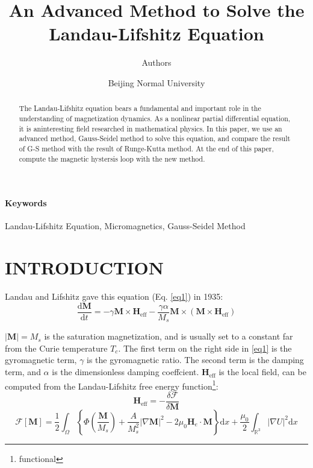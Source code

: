 \documentclass{article}
\renewcommand{\d}[2]{\frac{\text{d} #1}{\text{d} #2}} %
\begin{document}
\title{An Advanced Method to Solve the Landau-Lifshitz Equation}
\author{Authors}
\date{Beijing Normal University}
\maketitle


\begin{abstract}
The Landau-Lifshitz equation bears a fundamental and important role in the understanding of magnetization dynamics. As a nonlinear partial differential equation, it is aninteresting field researched in mathematical physics. In this paper, we use an advanced method, Gauss-Seidel method to solve this equation, and compare the result of G-S method with the result of Runge-Kutta method. At the end of this paper, compute the magnetic hystersis loop with the new method.
\end{abstract}
\paragraph{Keywords} Landau-Lifshitz Equation, Micromagnetics, Gauss-Seidel Method


\section{INTRODUCTION}
Landau and Lifshitz gave this equation (Eq. \eqref{eq1}) in 1935:
\begin{equation}
\d{\bm{M}}{t}=-\gamma \bm{M}\times \bm{H}_\text{eff}-\frac{\gamma \alpha}{M_s} \bm{M}\times \left(\bm{M}\times\bm{H}_\text{eff}\right)\label{eq1}
\end{equation}

$\left|\bm{M}\right|=M_s$ is the saturation magnetization, and is usually set to a constant far from the Curie temperature $T_c$. The first term on the right side in \eqref{eq1} is the gyromagnetic term, $\gamma$ is the gyromagnetic ratio. The second term is the damping term, and $\alpha$ is the dimensionless damping coeffcient. $\bm{H}_\text{eff}$ is the local field, can be computed from the Landau-Lifshitz free energy function\footnote{functional}:
\begin{equation}
\bm{H}_\text{eff}=-\frac{\delta \mathcal{F}}{\delta \bm{M}}\label{eq2}
\end{equation}
\begin{equation}
\mathcal{F}\left[\bm{M}\right]=\frac{1}{2}\int_{\Omega}\left\{\Phi \left(\frac{\bm{M}}{M_s}\right)+\frac{A}{M_s^2}\left|\nabla\bm{M}\right|^2-2\mu_0\bm{H}_{e}\cdot \bm{M}\right\}\mathrm{d}x +\frac{\mu_0}{2}\int_{\mathbb{R}^3}\left|\nabla U\right|^2\mathrm{d}x\label{eq3}
\end{equation}
\end{document}
